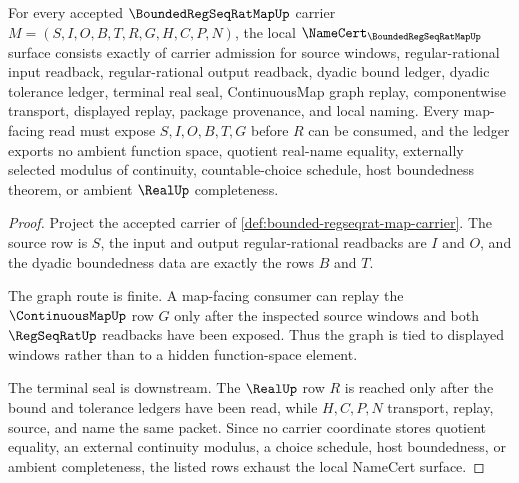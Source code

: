 \begin{theorem}
\label{thm:bounded-regseqrat-map-namecert-obligations}
For every accepted $\BoundedRegSeqRatMapUp$ carrier $M=(S,I,O,B,T,R,G,H,C,P,N)$, the local $\NameCert_{\BoundedRegSeqRatMapUp}$ surface consists exactly of carrier admission for source windows, regular-rational input readback, regular-rational output readback, dyadic bound ledger, dyadic tolerance ledger, terminal real seal, ContinuousMap graph replay, componentwise transport, displayed replay, package provenance, and local naming. Every map-facing read must expose $S,I,O,B,T,G$ before $R$ can be consumed, and the ledger exports no ambient function space, quotient real-name equality, externally selected modulus of continuity, countable-choice schedule, host boundedness theorem, or ambient $\RealUp$ completeness.
\end{theorem}
\begin{proof}
Project the accepted carrier of \autoref{def:bounded-regseqrat-map-carrier}. The source row is $S$, the input and output regular-rational readbacks are $I$ and $O$, and the dyadic boundedness data are exactly the rows $B$ and $T$.

The graph route is finite. A map-facing consumer can replay the $\ContinuousMapUp$ row $G$ only after the inspected source windows and both $\RegSeqRatUp$ readbacks have been exposed. Thus the graph is tied to displayed windows rather than to a hidden function-space element.

The terminal seal is downstream. The $\RealUp$ row $R$ is reached only after the bound and tolerance ledgers have been read, while $H,C,P,N$ transport, replay, source, and name the same packet. Since no carrier coordinate stores quotient equality, an external continuity modulus, a choice schedule, host boundedness, or ambient completeness, the listed rows exhaust the local NameCert surface.
\end{proof}

